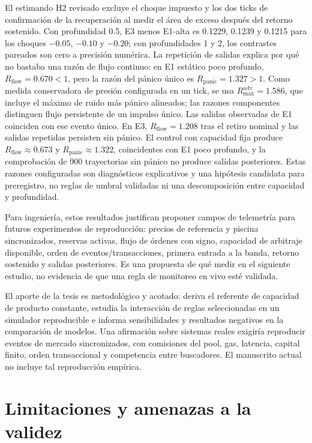 El estimando H2 revisado excluye el choque impuesto y los dos ticks de confirmación de la recuperación al medir el área de exceso después del retorno sostenido. Con profundidad 0.5, E3 menos E1-alta es 0.1229, 0.1239 y 0.1215 para los choques $-0.05$, $-0.10$ y $-0.20$; con profundidades 1 y 2, los contrastes pareados son cero a precisión numérica. La repetición de salidas explica por qué no bastaba una razón de flujo continuo: en E1 estático poco profundo, $R_{\mathrm{flow}}=0.670<1$, pero la razón del pánico único es $R_{\mathrm{panic}}=1.327>1$. Como medida conservadora de presión configurada en un tick, se usa $R_{\max}^{\mathrm{adv}}=1.586$, que incluye el máximo de ruido más pánico alineados; las razones componentes distinguen flujo persistente de un impulso único. Las salidas observadas de E1 coinciden con ese evento único. En E3, $R_{\mathrm{flow}}=1.208$ tras el retiro nominal y las salidas repetidas persisten sin pánico. El control con capacidad fija produce $R_{\mathrm{flow}}\approx0.673$ y $R_{\mathrm{panic}}\approx1.322$, coincidentes con E1 poco profundo, y la comprobación de 900 trayectorias sin pánico no produce salidas posteriores. Estas razones configuradas son diagnósticos explicativos y una hipótesis candidata para preregistro, no reglas de umbral validadas ni una descomposición entre capacidad y profundidad.

Para ingeniería, estos resultados justifican proponer campos de telemetría para futuros experimentos de reproducción: precios de referencia y piscina sincronizados, reservas activas, flujo de órdenes con signo, capacidad de arbitraje disponible, orden de eventos/transacciones, primera entrada a la banda, retorno sostenido y salidas posteriores. Es una propuesta de qué medir en el siguiente estudio, no evidencia de que una regla de monitoreo en vivo esté validada.

El aporte de la tesis es metodológico y acotado: deriva el referente de capacidad de producto constante, estudia la interacción de reglas seleccionadas en un simulador reproducible e informa sensibilidades y resultados negativos en la comparación de modelos. Una afirmación sobre sistemas reales exigiría reproducir eventos de mercado sincronizados, con comisiones del pool, gas, latencia, capital finito, orden transaccional y competencia entre buscadores. El manuscrito actual no incluye tal reproducción empírica.

\section{Limitaciones y amenazas a la validez}

